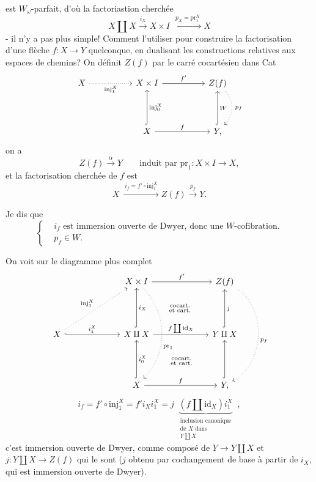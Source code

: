 \documentclass[11pt]{article}
\newcommand{\printedpage}[1]{\marginpar{\footnotesize p.~#1}}
\newcommand{\msp}[1]{\marginpar{\footnotesize [#1]}}
\begin{document}
est $W_\omega$-parfait, d'où la factoriastion cherchée %
\[
X \amalg X \xrightarrow{i_X} X \times I \ \xrightarrow{\ p_X = \mathrm{pr}_1^X\ } X
\]
- il n'y a pas plus simple! Comment l'utiliser pour construire la factorisation d'une flèche $f : X \longrightarrow Y$ quelconque, en dualisant les constructions relatives aux espaces de chemins? On définit $Z(f)$ par le carré cocartésien dans Cat
\[
\begin{tikzcd}[column sep=5em, row sep=4em]
X \arrow[r, dotted, "\mathrm{inj}_1^X"'] & X \times I \arrow[r, "f'"] & Z(f) \arrow[d, dotted, bend left=45, "\,p_f"] \\
& X \arrow[u, hook, "\mathrm{inj}_0^X"'] \arrow[r, "f"] & Y, \arrow[u, hook, "W"']
\end{tikzcd}
\]
on a
\[
Z(f) \xrightarrow{\alpha} Y \qquad \text{induit par } \mathrm{pr}_1 : X \times I \longrightarrow X,
\]
et la factorisation cherchée de $f$ est
\[
X \ \xrightarrow{\ i_f = f' \circ \mathrm{inj}_1^X\ } Z(f) \xrightarrow{p_f} Y.
\]

Je dis que
\[
\left\{
\begin{aligned}
& i_f \text{ est immersion ouverte de Dwyer, donc une } W\text{-cofibration.} \\
& p_f \in W.
\end{aligned}
\right.
\]

\msp{page 230}
On voit sur le diagramme plus complet
\[
\begin{tikzcd}[column sep=6.5em, row sep=4.5em]
& X \times I \arrow[r, "f'"] \arrow[dd, dotted, bend left=45, "\mathrm{pr}_1"{pos=.60}] \arrow[dr, phantom, "\substack{\text{cocart.}\\ \text{et cart.}}"] & Z(f) \arrow[dd, dotted, bend left=60, "p_f"] \\
X \arrow[ur, dotted, "\mathrm{inj}_1^X"] \arrow[r, hook, "i_1^X"] & X \amalg X \arrow[u, hook, "i_X"'] \arrow[r, "f \coprod \mathrm{id}_X"] \arrow[dr, phantom, "\substack{\text{cocart.}\\ \text{et cart.}}"] & Y \amalg X \arrow[u, hook, "j"'] \\
& X \arrow[u, hook, "i_0^X"'] \arrow[r, "f"] & Y, \arrow[u, hook]
\end{tikzcd}
\]
\printedpage{147}
\[
i_f = f' \circ \mathrm{inj}_1^X = f' i_X i_1^X = j \ \ \underbrace{(f \amalg \mathrm{id}_X) i_1^X}_{\substack{\text{inclusion canonique}\\ \text{de } X \text{ dans}\\ Y \coprod X}} \ \ ,
\]
c'est immersion ouverte de Dwyer, comme composé de $Y \longrightarrow Y \amalg X$ et $j : Y \amalg X \longrightarrow Z(f)$ qui le sont ($j$ obtenu par cochangement de base à partir de $i_X$, qui est immersion ouverte de Dwyer).
\end{document}
